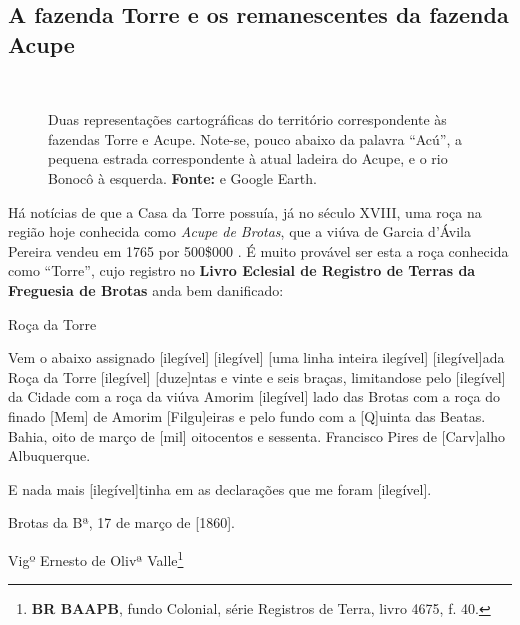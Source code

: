\subsection{A fazenda Torre e os remanescentes da fazenda Acupe}

\begin{figure}[!htp]
\centering
{}
\  %
\caption{Duas representações cartográficas do território correspondente às fazendas Torre e Acupe. Note-se, pouco abaixo da palavra ``Acú'', a pequena estrada correspondente à atual ladeira do Acupe, e o rio Bonocô à esquerda. \textbf{Fonte:}  e Google Earth.}
\end{figure}

Há notícias de que a Casa da Torre possuía, já no século XVIII, uma roça na região hoje conhecida como \textit{Acupe de Brotas}, que a viúva de Garcia d'Ávila Pereira vendeu em 1765 por 500\$000 \cite[p.~10]{ott_engenhos_1996}. É muito provável ser esta a roça conhecida como ``Torre'', cujo registro no \textbf{Livro Eclesial de Registro de Terras da Freguesia de Brotas} anda bem danificado:

\begin{citacao}
Roça da Torre

Vem o abaixo assignado [ilegível] [ilegível] [uma linha inteira ilegível] [ilegível]ada Roça da Torre [ilegível] [duze]ntas e vinte e seis braças, limitandose pelo [ilegível] da Cidade com a roça da viúva Amorim [ilegível] lado das Brotas com a roça do finado [Mem] de Amorim [Filgu]eiras e pelo fundo com a [Q]uinta das Beatas. Bahia, oito de março de [mil] oitocentos e sessenta. Francisco Pires de [Carv]alho Albuquerque. 

E nada mais [ilegível]tinha em as declarações que me foram [ilegível].

Brotas da Bª, 17 de março de [1860].

Vigº Ernesto de Olivª Valle\footnote{\textbf{BR BAAPB}, fundo Colonial, série Registros de Terra, livro 4675, f. 40.}
\end{citacao}

